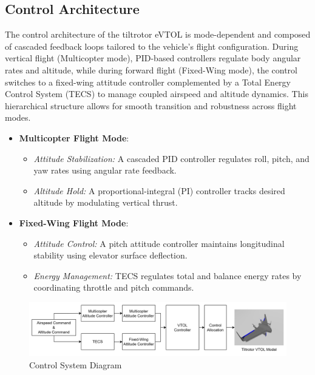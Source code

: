\documentclass[journal,article,submit,pdftex,moreauthors]{Definitions/mdpi}
\begin{document}
\subsection{Control Architecture}
The control architecture of the tiltrotor eVTOL is mode-dependent and composed of cascaded feedback loops tailored to the vehicle’s flight configuration. During vertical flight (Multicopter mode), PID-based controllers regulate body angular rates and altitude, while during forward flight (Fixed-Wing mode), the control switches to a fixed-wing attitude controller complemented by a Total Energy Control System (TECS) to manage coupled airspeed and altitude dynamics. This hierarchical structure allows for smooth transition and robustness across flight modes.
\begin{itemize}
    \item \textbf{Multicopter Flight Mode}:
    \begin{itemize}
        \item \textit{Attitude Stabilization:} A cascaded PID controller regulates roll, pitch, and yaw rates using angular rate feedback.
        \item \textit{Altitude Hold:} A proportional-integral (PI) controller tracks desired altitude by modulating vertical thrust.
    \end{itemize}
    
    \item \textbf{Fixed-Wing Flight Mode}:
    \begin{itemize}
        \item \textit{Attitude Control:} A pitch attitude controller maintains longitudinal stability using elevator surface deflection.
        \item \textit{Energy Management:} TECS regulates total and balance energy rates by coordinating throttle and pitch commands.
    \end{itemize}
\end{itemize}
\begin{figure}[H]
    \centering
    \includegraphics[width=0.9\linewidth]{figures/control_system_diagram.png}
    \caption{Control System Diagram}
    \label{fig:control_system_diagram}
\end{figure}
\end{document}

